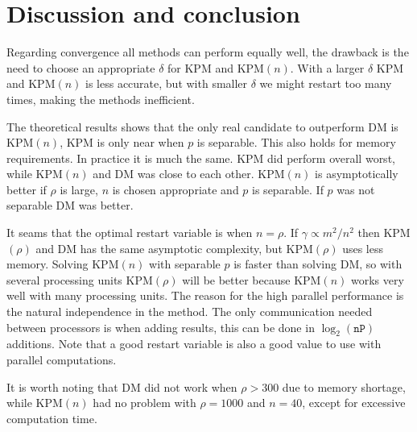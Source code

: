 \chapter{Discussion and conclusion}%
Regarding convergence all methods can perform equally well, the drawback is the need to choose an appropriate $\delta$ for KPM and KPM$(n)$. With a larger $\delta$ KPM and KPM$(n)$ is less accurate, but with smaller $\delta$ we might restart too many times, making the methods inefficient. 


The theoretical results shows that the only real candidate to outperform DM is KPM$(n)$, KPM is only near when $p$ is separable. This also holds for memory requirements. In practice it is much the same. KPM did perform overall worst, while KPM$(n)$ and DM was close to each other. KPM$(n)$ is asymptotically better if $\rho$ is large, $n$ is chosen appropriate and $p$ is separable. If $p$ was not separable DM was better.

It seams that the optimal restart variable is when $n = \rho$. If $\gamma \propto m^2/n^2$ then KPM$(\rho)$ and DM has the same asymptotic complexity, but KPM$(\rho)$ uses less memory. Solving KPM$(n)$ with separable $p$ is faster than solving DM, so with several processing units KPM$(\rho)$ will be better because KPM$(n)$ works very well with many processing units. The reason for the high parallel performance is the natural independence in the method. The only communication needed between processors is when adding results, this can be done in $\log_2(\texttt{nP})$ additions. Note that a good restart variable is also a good value to use with parallel computations.




It is worth noting that DM did not work when $\rho>300$ due to memory shortage, while KPM$(n)$ had no problem with $\rho = 1000$ and $n = 40$, except for excessive computation time. \\




